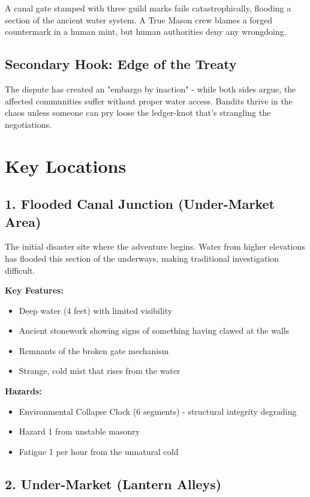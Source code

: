 \documentclass[11pt]{article}
\begin{document}
A canal gate stamped with three guild marks fails catastrophically, flooding a section of the ancient water system. A True Mason crew blames a forged countermark in a human mint, but human authorities deny any wrongdoing.

\subsection{Secondary Hook: Edge of the Treaty}

The dispute has created an "embargo by inaction" - while both sides argue, the affected communities suffer without proper water access. Bandits thrive in the chaos unless someone can pry loose the ledger-knot that's strangling the negotiations.

\section{Key Locations}

\subsection{1. Flooded Canal Junction (Under-Market Area)}

The initial disaster site where the adventure begins. Water from higher elevations has flooded this section of the underways, making traditional investigation difficult.

\textbf{Key Features:}
\begin{itemize}
\item Deep water (4 feet) with limited visibility
\item Ancient stonework showing signs of something having clawed at the walls
\item Remnants of the broken gate mechanism
\item Strange, cold mist that rises from the water
\end{itemize}

\textbf{Hazards:}
\begin{itemize}
\item Environmental Collapse Clock (6 segments) - structural integrity degrading
\item Hazard 1 from unstable masonry
\item Fatigue 1 per hour from the unnatural cold
\end{itemize}

\subsection{2. Under-Market (Lantern Alleys)}
\end{document}
